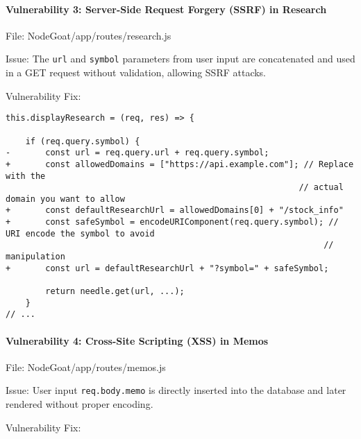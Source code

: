   \hypertarget{vulnerability-3-server-side-request-forgery-ssrf-in-research}{%
  \paragraph{Vulnerability 3: Server-Side Request Forgery (SSRF) in
  Research}\label{vulnerability-3-server-side-request-forgery-ssrf-in-research}}
  
  File: NodeGoat/app/routes/research.js
  
  Issue: The \texttt{url} and \texttt{symbol} parameters from user input
  are concatenated and used in a GET request without validation, allowing
  SSRF attacks.
  
  Vulnerability Fix:
  
  \begin{framed}\scriptsize
    \begin{verbatim}
this.displayResearch = (req, res) => {

    if (req.query.symbol) {
-       const url = req.query.url + req.query.symbol;
+       const allowedDomains = ["https://api.example.com"]; // Replace with the 
                                                           // actual domain you want to allow
+       const defaultResearchUrl = allowedDomains[0] + "/stock_info"
+       const safeSymbol = encodeURIComponent(req.query.symbol); // URI encode the symbol to avoid 
                                                                // manipulation
+       const url = defaultResearchUrl + "?symbol=" + safeSymbol;

        return needle.get(url, ...);
    }
// ...
      \end{verbatim}
      
  \end{framed}\normalsize
  
  \hypertarget{vulnerability-4-cross-site-scripting-xss-in-memos}{%
  \paragraph{Vulnerability 4: Cross-Site Scripting (XSS) in
  Memos}\label{vulnerability-4-cross-site-scripting-xss-in-memos}}
  
  File: NodeGoat/app/routes/memos.js
  
  Issue: User input \texttt{req.body.memo} is directly inserted into the
  database and later rendered without proper encoding.
  
  Vulnerability Fix:
  
